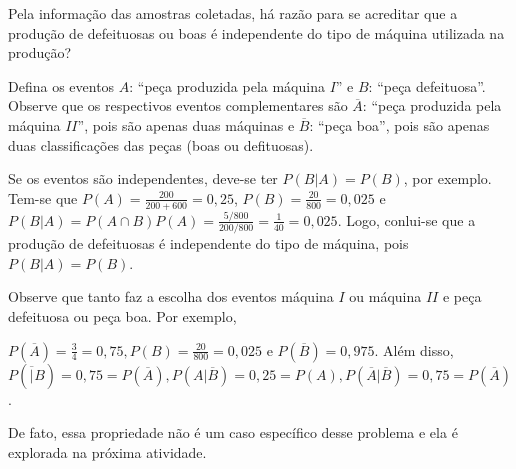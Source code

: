 \documentclass[10 pt,usenames,dvipsnames, oneside]{article}
\begin{document}
Pela informação das amostras coletadas, há razão para se acreditar que a produção de defeituosas ou boas é independente do tipo de máquina utilizada na produção?

\ifdefined\prof
\begin{solucao}

Defina os eventos $A$: “peça produzida pela máquina $I”$ e $B$: “peça defeituosa”. Observe que os respectivos eventos complementares são $\overline{A}$: “peça produzida pela máquina $II$”, pois são apenas duas máquinas e $\overline{B}$: “peça boa”, pois são apenas duas classificações das peças (boas ou defituosas).

Se os eventos são independentes, deve-se ter $P(B|A)=P(B)$, por exemplo. Tem-se que $P(A)=\frac{200}{200+600}=0{,}25$, $P(B)=\frac{20}{800}=0{,}025$ e $P(B|A)=P(A\cap B)P(A)=\frac{5/800}{200/800}=\frac{1}{40}=0{,}025$. Logo, conlui-se que a produção de defeituosas é independente do tipo de máquina, pois $P(B|A)=P(B)$.

Observe que tanto faz a escolha dos eventos máquina $I$ ou máquina $II$ e peça defeituosa ou peça boa. Por exemplo,

$P(\overline{A})=\frac{3}{4}=0{,}75, P(B)=\frac{20}{800}=0{,}025$ e $P(\overline{B})=0{,}975$. Além disso, $P(\overline|B)=0{,}75=P(\overline{A}), P(A|\overline{B})=0{,}25=P(A), P(\overline{A}|\overline{B})=0{,}75=P(\overline{A})$.

De fato, essa propriedade não é um caso específico desse problema e ela é explorada na próxima atividade.

\end{solucao}
\fi
\end{document}
